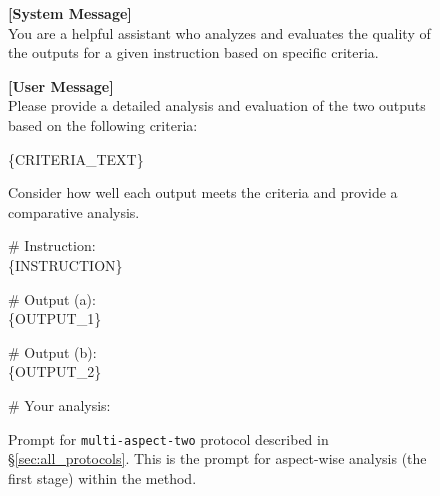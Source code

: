 \begin{figure*}[t!]
\begin{tcolorbox}[colback=black!3!white, colframe=black!70!white, title=Multi-aspect-two (aspect-wise analysis stage), fontupper=\footnotesize, fonttitle=\footnotesize]
\textbf{[System Message]} \\
You are a helpful assistant who analyzes and evaluates the quality of the outputs for a given instruction based on specific criteria.
\newline

\textbf{[User Message]}\\
Please provide a detailed analysis and evaluation of the two outputs based on the following criteria:

\{CRITERIA\_TEXT\}
\newline

Consider how well each output meets the criteria and provide a comparative analysis.
\newline

\# Instruction: \\
\{INSTRUCTION\}
\newline

\# Output (a): \\
\{OUTPUT\_1\}
\newline

\# Output (b): \\
\{OUTPUT\_2\}
\newline

\# Your analysis:
\end{tcolorbox}
\caption{Prompt for \texttt{multi-aspect-two} protocol described in \S\ref{sec:all_protocols}.  This is the prompt for aspect-wise analysis (the first stage) within the method.}
\label{fig:prompt_multi_aspect_two_analysis}
\end{figure*}


